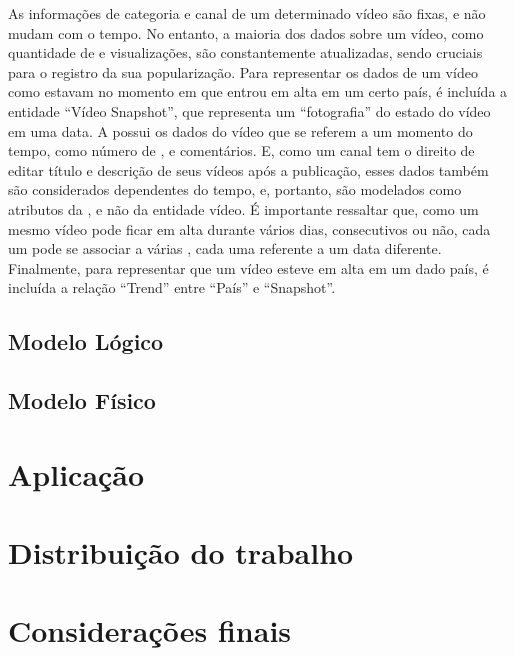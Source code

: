   As informações de categoria e canal de um determinado vídeo são fixas, e não mudam com o tempo. No entanto, a maioria dos dados sobre um vídeo, como quantidade de  e visualizações, são constantemente atualizadas, sendo cruciais para o registro da sua popularização. Para representar os dados de um vídeo como estavam no momento em que entrou em alta em um certo país, é incluída a entidade ``Vídeo Snapshot'', que representa um ``fotografia'' do estado do vídeo em uma data. A  possui os dados do vídeo que se referem a um momento do tempo, como número de ,  e comentários. E, como um canal tem o direito de editar título e descrição de seus vídeos após a publicação, esses dados também são considerados dependentes do tempo, e, portanto, são modelados como atributos da , e não da entidade vídeo. É importante ressaltar que, como um mesmo vídeo pode ficar em alta durante vários dias, consecutivos ou não, cada um pode se associar a várias , cada uma referente a um data diferente. Finalmente, para representar que um vídeo esteve em alta em um dado país, é incluída a relação ``Trend'' entre ``País'' e ``Snapshot''.


\section{Modelo Lógico}

\section{Modelo Físico}


\chapter{Aplicação}



\chapter{Distribuição do trabalho}



\chapter{Considerações finais}

